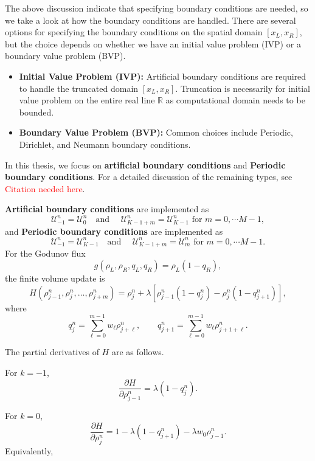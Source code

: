 The above discussion indicate that specifying boundary conditions are needed, so we take a look at how the boundary conditions are handled.
There are several options for specifying the boundary conditions on the spatial domain $[x_L, x_R]$, but the choice depends on whether we have an initial value problem (IVP) or a boundary value problem (BVP).

\begin{itemize}
    \item \textbf{Initial Value Problem (IVP):} Artificial boundary conditions are required to handle the truncated domain $[x_L, x_R]$. Truncation is necessarily for initial value problem on the entire real line $\mathbb{R}$ as computational domain needs to be bounded.
    \item \textbf{Boundary Value Problem (BVP):} Common choices include  Periodic, Dirichlet, and Neumann boundary conditions.
\end{itemize}

In this thesis, we focus on \textbf{artificial boundary conditions} and \textbf{Periodic boundary conditions}. For a detailed discussion of the remaining types, see \textcolor{red}{Citation needed here}.

\textbf{Artificial boundary conditions} are implemented as
\[
    \mathcal{U}_{-1}^{n}= \mathcal{U}_{0}^n \quad \text{and } \quad \mathcal{U}_{K-1+m}^{n} = \mathcal{U}_{K-1}^n \text{ for } m = 0, \cdots M-1,
\]
and \textbf{Periodic boundary conditions} are implemented as
\[
    \mathcal{U}_{-1}^{n}= \mathcal{U}_{K-1}^n \quad \text{and } \quad \mathcal{U}_{K-1+m}^{n} = \mathcal{U}_{m}^n \text{ for } m = 0, \cdots M-1.
\]
For the Godunov flux
\[
    g(\rho_L,\rho_R,q_L,q_R)=\rho_L(1-q_R),
\]
the finite volume update is
\[
    H(\rho_{j-1}^n,\rho_j^n,\ldots,\rho_{j+m}^n)
    =
    \rho_j^n
    +
    \lambda
    \left[
        \rho_{j-1}^n(1-q_j^n)
        -
        \rho_j^n(1-q_{j+1}^n)
        \right],
\]
where
\[
    q_j^n=\sum_{\ell=0}^{m-1}w_\ell \rho_{j+\ell}^n,
    \qquad
    q_{j+1}^n=\sum_{\ell=0}^{m-1}w_\ell \rho_{j+1+\ell}^n.
\]

The partial derivatives of \(H\) are as follows.

For \(k=-1\),
\[
    \frac{\partial H}{\partial \rho_{j-1}^n}
    =
    \lambda(1-q_j^n).
\]

For \(k=0\),
\[
    \frac{\partial H}{\partial \rho_j^n}
    =
    1
    -
    \lambda(1-q_{j+1}^n)
    -
    \lambda w_0\rho_{j-1}^n.
\]
Equivalently,
